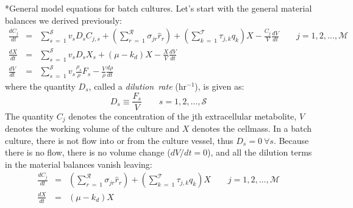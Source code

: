 \documentclass[11pt]{article}
\makeatletter
\theoremstyle{definition}
\renewcommand\subsection{\@startsection
	{subsection}{2}{0mm}
	{-0.05in}
	{-0.5\baselineskip}
	{\normalfont\normalsize\bfseries}}
\makeatother
\begin{document}
\subsection*{General model equations for batch cultures.}
Let's start with the general material balances we derived previously:
\begin{eqnarray}\label{eqn-metabolite-dilution-dynamic}
	\frac{dC_{j}}{dt} &=& \sum_{s~=~1}^{\mathcal{S}}v_{s}D_{s}C_{j,s} + \left(\sum_{r~=~1}^{\mathcal{R}}\sigma_{jr}\hat{r}_{r}\right) + \left(\sum_{k~=~1}^{\mathcal{T}}\tau_{j,k}q_{k}\right)X  - \frac{C_{j}}{V}\frac{dV}{dt}\qquad j=1,2,\dots,\mathcal{M}\\
	\frac{dX}{dt} &=& \sum_{s~=~1}^{\mathcal{S}}v_{s}D_{s}X_{s}+\left(\mu - k_{d}\right)X - \frac{X}{V}\frac{dV}{dt}\\
	\frac{dV}{dt} &=& \sum_{s~=~1}^{\mathcal{S}}v_{s}\frac{\rho_{s}}{\rho}F_{s} - \frac{V}{\rho}\frac{d\rho}{dt}
\end{eqnarray}where the quantity $D_{s}$,  called a \textit{dilution~rate} (hr$^{-1}$), is given as:
\begin{equation}
	D_{s} \equiv \frac{F_{s}}{V}\qquad s=1,2,\dots,\mathcal{S}
\end{equation}The quantity $C_{j}$ denotes the concentration of the jth extracellular metabolite, $V$ denotes the working volume of the culture and $X$ denotes the cellmass.
In a batch culture, there is not flow into or from the culture vessel, thus $D_{s} = 0~\forall{s}$. Because there is no flow, there is no volume change ($dV/dt = 0$), and all the dilution terms in the material balances vanish leaving:
\begin{eqnarray}\label{eqn-metabolite-batch}
	\frac{dC_{j}}{dt} &=& \left(\sum_{r~=~1}^{\mathcal{R}}\sigma_{jr}\hat{r}_{r}\right) + \left(\sum_{k~=~1}^{\mathcal{T}}\tau_{j,k}q_{k}\right)X \qquad j=1,2,\dots,\mathcal{M}\\
	\frac{dX}{dt} &=& \left(\mu - k_{d}\right)X
\end{eqnarray}
\end{document}
